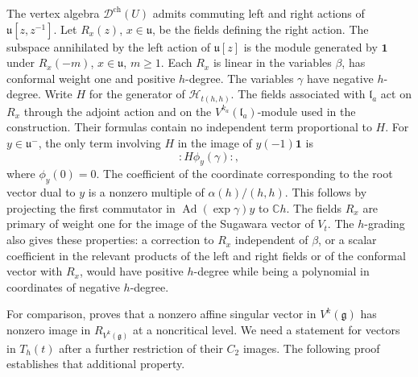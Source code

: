 \documentclass[11pt,a4paper]{amsart}
\numberwithin{equation}{section}
\theoremstyle{definition}
\theoremstyle{remark}
\newcommand{\C}{\mathbb C}
\newcommand{\g}{\mathfrak g}
\newcommand{\uu}{\mathfrak u}
\newcommand{\lev}{\mathfrak l}
\begin{document}
The vertex algebra $\mathcal D^{\mathrm{ch}}(U)$ admits commuting
left and right actions of $\uu[z,z^{-1}]$. Let $R_x(z)$,
$x\in\uu$, be the fields defining the right action. The subspace
annihilated by the left action of $\uu[z]$ is the module generated
by $\mathbf1$ under $R_x(-m)$, $x\in\uu$, $m\ge1$.
Each $R_x$ is linear in the variables $\beta$, has conformal weight
one and positive $h$-degree. The variables $\gamma$ have negative
$h$-degree. Write $H$ for the generator of $\mathcal H_{t(h,h)}$.
The fields associated with $\lev_a$ act on $R_x$ through the adjoint
action and on the $V^{k_a}(\lev_a)$-module used in the construction. Their formulas contain no independent term proportional to $H$.
For $y\in\uu^-$, the only term involving $H$ in the image of
$y(-1)\mathbf1$ is
$$
                         :H\phi_y(\gamma):,
$$
where $\phi_y(0)=0$. The coefficient of the coordinate corresponding
to the root vector dual to $y$ is a nonzero multiple of
$\alpha(h)/(h,h)$. This follows by projecting the first commutator
in $\operatorname{Ad}(\exp\gamma)y$ to $\C h$.
The fields $R_x$ are primary of weight one for the image of the
Sugawara vector of $V_t$. The $h$-grading also gives these
properties: a correction to $R_x$ independent of $\beta$, or a
scalar coefficient in the relevant products of the left and right
fields or of the conformal vector with $R_x$, would have positive
$h$-degree while being a polynomial in coordinates of negative
$h$-degree.

For comparison, \cite[Theorem~1.2]{ArakawaJiangMoreau2021} proves that
a nonzero affine singular vector in $V^k(\g)$ has nonzero image in
$R_{V^k(\g)}$ at a noncritical level. We need a statement for vectors
in $T_h(t)$ after a further restriction of their $C_2$ images.
The following proof establishes that additional property.
\end{document}
